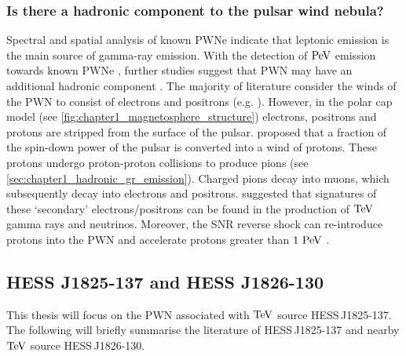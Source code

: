 \subsubsection{Is there a hadronic component to the pulsar wind nebula?}

Spectral and spatial analysis of known PWNe indicate that leptonic emission is the main source of gamma-ray emission. With the detection of $\PeV$ emission towards known PWNe \citep{doi:10.1126/science.abg5137}, further studies suggest that PWN may have an additional hadronic component \citep{10.1111/j.1745-3933.2010.00934.x, Xin_2019, 2021ApJ...922..221L}. The majority of literature consider the winds of the PWN to consist of electrons and positrons (e.g. \cite{2018A&A...612A...2H}). However, in the polar cap model (see \autoref{fig:chapter1_magnetosphere_structure}) electrons, positrons and protons are stripped from the surface of the pulsar. \cite{1994ApJ...435..230G} proposed that a fraction of the spin-down power of the pulsar is converted into a wind of protons. These protons undergo proton-proton collisions to produce pions (see \autoref{sec:chapter1_hadronic_gr_emission}). Charged pions decay into muons, which subsequently decay into electrons and positrons. \cite{2003A&A...402..827A} suggested that signatures of these `secondary' electrons/positrons can be found in the production of $\TeV$ gamma rays and neutrinos. Moreover, the SNR reverse shock can re-introduce protons into the PWN and accelerate protons greater than $1~\PeV$ \citep{1992MNRAS.257..493B,2018MNRAS.478..926O}.


\subsection{HESS J1825-137 and HESS J1826-130} \label{sec:01_1825_1826}


This thesis will focus on the PWN associated with $\TeV$ source \mbox{HESS\,J1825-137}. The following will briefly summarise the literature of \mbox{HESS\,J1825-137} and nearby $\TeV$ source \mbox{HESS\,J1826-130}.

